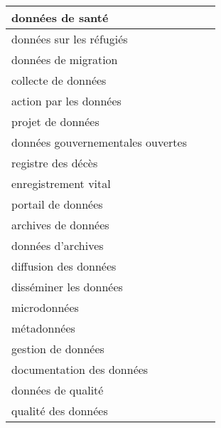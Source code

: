 \documentclass[
]{article}
\begin{document}
\begin{table}[H]
\begin{tabular}{l|l|l}
\hline
données de santé &  & \\
\hline
données sur les réfugiés &  & \\
\hline
données de migration &  & \\
\hline
collecte de données &  & \\
\hline
action par les données &  & \\
\hline
projet de données &  & \\
\hline
données gouvernementales ouvertes &  & \\
\hline
registre des décès &  & \\
\hline
enregistrement vital &  & \\
\hline
portail de données &  & \\
\hline
archives de données &  & \\
\hline
données d'archives &  & \\
\hline
diffusion des données &  & \\
\hline
disséminer les données &  & \\
\hline
microdonnées &  & \\
\hline
métadonnées &  & \\
\hline
gestion de données &  & \\
\hline
documentation des données &  & \\
\hline
données de qualité &  & \\
\hline
qualité des données &  & \\
\hline
\end{tabular}
\endgroup{}
\end{table}
\end{document}
